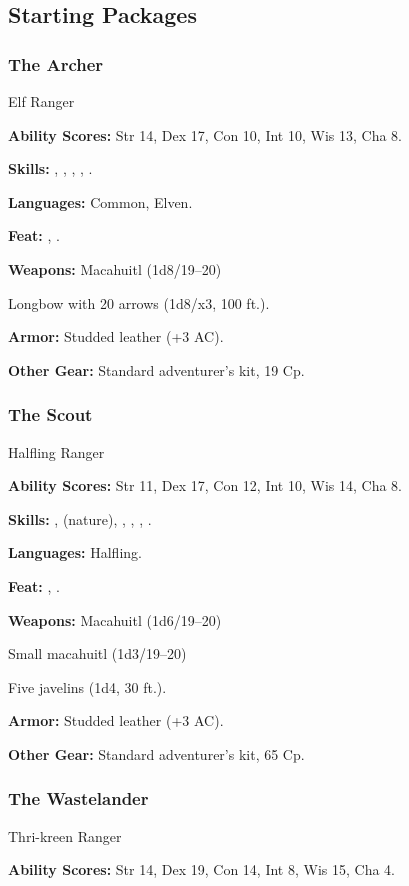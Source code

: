\subsection{Starting Packages}
\subsubsection{The Archer}
Elf Ranger

\textbf{Ability Scores:} Str 14, Dex 17, Con 10, Int 10, Wis 13, Cha 8.

\textbf{Skills:} , , , , .

\textbf{Languages:} Common, Elven.

\textbf{Feat:} , .

\textbf{Weapons:} Macahuitl (1d8/19--20)

Longbow with 20 arrows (1d8/x3, 100 ft.).

\textbf{Armor:} Studded leather (+3 AC).

\textbf{Other Gear:} Standard adventurer's kit, 19 Cp.

\subsubsection{The Scout}
Halfling Ranger

\textbf{Ability Scores:} Str 11, Dex 17, Con 12, Int 10, Wis 14, Cha 8.

\textbf{Skills:} ,  (nature), , , , .

\textbf{Languages:} Halfling.

\textbf{Feat:} , .

\textbf{Weapons:} Macahuitl (1d6/19--20)

Small macahuitl (1d3/19--20)

Five javelins (1d4, 30 ft.).

\textbf{Armor:} Studded leather (+3 AC).

\textbf{Other Gear:} Standard adventurer's kit, 65 Cp.

\subsubsection{The Wastelander}
Thri-kreen Ranger

\textbf{Ability Scores:} Str 14, Dex 19, Con 14, Int 8, Wis 15, Cha 4.

